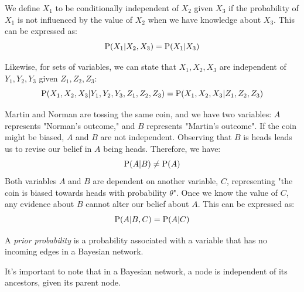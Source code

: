 \documentclass[12pt, a4paper]{report}
\begin{document}
    \begin{definition}
        We define $X_1$ to be conditionally independent of $X_2$ given $X_3$ if the probability of $X_1$ is not influenced by the value of $X_2$ when we have knowledge about $X_3$.  
        This can be expressed as:
        \[\textnormal{P}(X_1|X_2,X_3)=\textnormal{P}(X_1|X_3)\]
    \end{definition}
    Likewise, for sets of variables, we can state that $X_1, X_2, X_3$ are independent of $Y_1, Y_2, Y_3$ given $Z_1,Z_2,Z_3$:
    \[\textnormal{P}(X_1,X_2,X_3|Y_1,Y_2,Y_3,Z_1,Z_2,Z_3)=\textnormal{P}(X_1,X_2,X_3|Z_1,Z_2,Z_3)\]
    \begin{example}
        Martin and Norman are tossing the same coin, and we have two variables: $A$ represents "Norman's outcome," and $B$ represents "Martin's outcome". 
        If the coin might be biased, $A$ and $B$ are not independent. 
        Observing that $B$ is heads leads us to revise our belief in $A$ being heads. 
        Therefore, we have:
        \[\textnormal{P}(A|B) \neq \textnormal{P}(A)\]
        Both variables $A$ and $B$ are dependent on another variable, $C$, representing "the coin is biased towards heads with probability $\theta$".
        Once we know the value of $C$, any evidence about $B$ cannot alter our belief about $A$.
        This can be expressed as:
        \[\textnormal{P}(A|B,C)=\textnormal{P}(A|C)\]
    \end{example}
    \begin{definition}
        A \emph{prior probability} is a probability associated with a variable that has no incoming edges in a Bayesian network. 
    \end{definition}
    It's important to note that in a Bayesian network, a node is independent of its ancestors, given its parent node.
\end{document}
